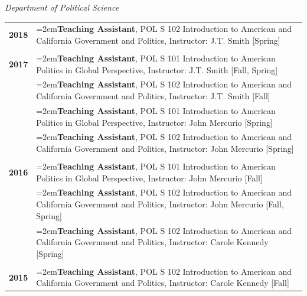 \documentclass[letterpaper,12pt]{article}
\begin{document}
\textit{Department of Political Science}
\begin{xltabular}{\dimexpr\textwidth-0in}{p{1.5in}X}

\textbf{2018} 	& \hangindent=2em\textbf{Teaching Assistant}, POL S 102 Introduction to American and California \mbox{Government} and Politics, \mbox{Instructor:} J.T. Smith [Spring]\\ \\

\textbf{2017} 	& \hangindent=2em\textbf{Teaching Assistant}, POL S 101 Introduction to American Politics in Global Perspective, \mbox{Instructor:} J.T. Smith [Fall, Spring]\\

			& \hangindent=2em\textbf{Teaching Assistant}, POL S 102 Introduction to American and California \mbox{Government} and Politics, \mbox{Instructor:} J.T. Smith [Fall]\\
			
			& \hangindent=2em\textbf{Teaching Assistant}, POL S 101 Introduction to American Politics in Global Perspective, \mbox{Instructor:} John Mercurio [Spring]\\

			& \hangindent=2em\textbf{Teaching Assistant}, POL S 102 Introduction to American and California \mbox{Government} and Politics, \mbox{Instructor:} John Mercurio [Spring]\\ \\
			
\textbf{2016} 	& \hangindent=2em\textbf{Teaching Assistant}, POL S 101 Introduction to American Politics in Global Perspective, \mbox{Instructor:} John Mercurio [Fall]\\

			& \hangindent=2em\textbf{Teaching Assistant}, POL S 102 Introduction to American and California \mbox{Government} and Politics, \mbox{Instructor:} John Mercurio [Fall, Spring]\\
			
			& \hangindent=2em\textbf{Teaching Assistant}, POL S 102 Introduction to American and California \mbox{Government} and Politics, \mbox{Instructor:} Carole Kennedy [Spring]\\ \\

\textbf{2015} 	& \hangindent=2em\textbf{Teaching Assistant}, POL S 102 Introduction to American and California \mbox{Government} and Politics, \mbox{Instructor:} Carole Kennedy [Fall]\\


\end{xltabular}
\end{document}
